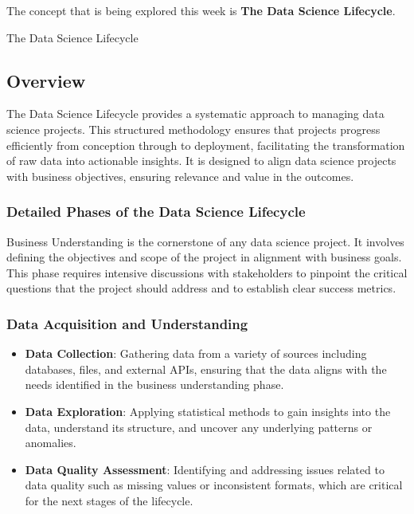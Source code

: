 The concept that is being explored this week is \textbf{The Data Science Lifecycle}.

\begin{notes}{The Data Science Lifecycle}
    \subsection*{Overview}

    The Data Science Lifecycle provides a systematic approach to managing data science projects. This structured methodology ensures that projects progress efficiently from conception through to 
    deployment, facilitating the transformation of raw data into actionable insights. It is designed to align data science projects with business objectives, ensuring relevance and value in the outcomes. \vspace*{1em}
    
    \subsubsection*{Detailed Phases of the Data Science Lifecycle}
    
    Business Understanding is the cornerstone of any data science project. It involves defining the objectives and scope of the project in alignment with business goals. This phase requires intensive 
    discussions with stakeholders to pinpoint the critical questions that the project should address and to establish clear success metrics. \vspace*{1em}
    
    \subsubsection*{Data Acquisition and Understanding}
    
    \begin{itemize}
        \item \textbf{Data Collection}: Gathering data from a variety of sources including databases, files, and external APIs, ensuring that the data aligns with the needs identified in the business understanding phase.
        \item \textbf{Data Exploration}: Applying statistical methods to gain insights into the data, understand its structure, and uncover any underlying patterns or anomalies.
        \item \textbf{Data Quality Assessment}: Identifying and addressing issues related to data quality such as missing values or inconsistent formats, which are critical for the next stages of the lifecycle.
    \end{itemize}
    

\end{notes}
